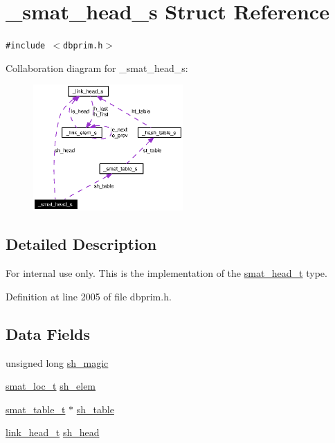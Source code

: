 \hypertarget{struct__smat__head__s}{
\section{\_\-smat\_\-head\_\-s Struct Reference}
\label{struct__smat__head__s}
}
{\tt \#include $<$dbprim.h$>$}

Collaboration diagram for \_\-smat\_\-head\_\-s:\begin{figure}[H]
\begin{center}
\leavevmode
\includegraphics[width=162pt]{struct__smat__head__s__coll__graph}
\end{center}
\end{figure}


\subsection{Detailed Description}
\begin{Desc}
\item[For internal use only.]
This is the implementation of the \hyperlink{group__dbprim__smat_ga1}{smat\_\-head\_\-t} type.\end{Desc}




Definition at line 2005 of file dbprim.h.\subsection*{Data Fields}
\begin{CompactItemize}
\item 
unsigned long \hyperlink{struct__smat__head__s_o0}{sh\_\-magic}
\item 
\hyperlink{group__dbprim__smat_ga6}{smat\_\-loc\_\-t} \hyperlink{struct__smat__head__s_o1}{sh\_\-elem}
\item 
\hyperlink{struct__smat__table__s}{smat\_\-table\_\-t} $\ast$ \hyperlink{struct__smat__head__s_o2}{sh\_\-table}
\item 
\hyperlink{struct__link__head__s}{link\_\-head\_\-t} \hyperlink{struct__smat__head__s_o3}{sh\_\-head}
\end{CompactItemize}


